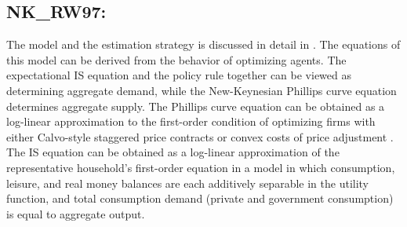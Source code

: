 \documentclass[11pt,a4paper]{article}
\begin{document}
	\subsection{NK\_RW97: \texorpdfstring{\cite{RotembergWoodford1997}}{Rotemberg and Woodford (1997)}}
	\label{NKRW9}
	The model and the estimation strategy is discussed in detail in
	\cite{RotembergWoodford1997}.  The equations of this model can be derived from the
	behavior of optimizing agents. The expectational IS equation and the
	policy rule together can be viewed as determining aggregate demand,
	while the New-Keynesian Phillips curve equation determines aggregate supply.
	The Phillips curve equation can be obtained as a log-linear approximation
	to the first-order condition of optimizing firms with either
	Calvo-style staggered price contracts \citep{Yun1996} or convex
	costs of price adjustment \citep{Rotemberg1982}. The IS equation
	can be obtained as a log-linear approximation of the
	representative household's first-order equation in a model in which
	consumption, leisure, and real money balances are each additively
	separable in the utility function, and total consumption demand
	(private and government consumption) is equal to aggregate output.
	
\end{document}

